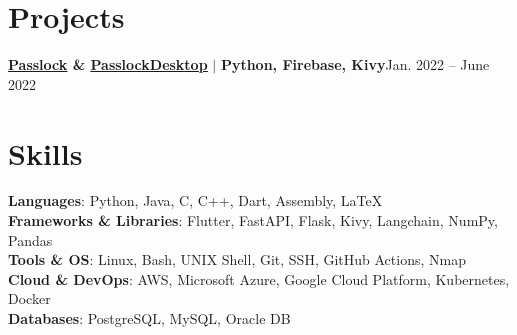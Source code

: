 \section{Projects}
\resumeSubHeadingListStart

\resumeProjectHeading
{\textbf{\href{https://github.com/AM-ash-OR-AM-I/Passlock}{\underline{Passlock}} \& \href{https://github.com/AM-ash-OR-AM-I/PasslockDesktop}{\underline{PasslockDesktop}}} $|$ \textbf{Python, Firebase, Kivy}}{Jan. 2022 -- June 2022}
\resumeItemListStart
{}
\resumeItemListEnd

\resumeSubHeadingListEnd

\vspace{-10px}
\section{Skills}
\begin{itemize}[leftmargin=0.15in, label={}]
  \small{\item{
        \textbf{Languages}{: Python, Java, C, C++, Dart, Assembly, LaTeX} \\
        \textbf{Frameworks \& Libraries}{: Flutter, FastAPI, Flask, Kivy, Langchain, NumPy, Pandas} \\
        \textbf{Tools \& OS}{: Linux, Bash, UNIX Shell, Git, SSH, GitHub Actions, Nmap} \\
        \textbf{Cloud \& DevOps}{: AWS, Microsoft Azure, Google Cloud Platform, Kubernetes, Docker} \\
        \textbf{Databases}{: PostgreSQL, MySQL, Oracle DB} \\
        }}

\end{itemize}

